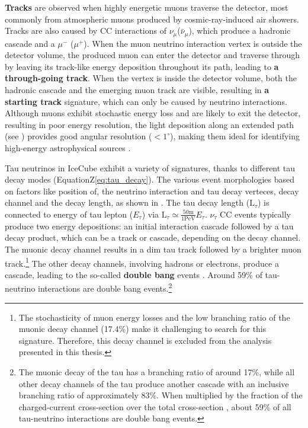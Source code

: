 \textbf{Tracks} are observed when highly energetic muons traverse the detector, most commonly from atmospheric muons produced by cosmic-ray-induced air showers. Tracks are also caused by CC interactions of $\nu_{\mu}$($\bar{\nu}_\mu$), which produce a hadronic cascade and a $\mu^-$ ($\mu^+$). When the muon neutrino interaction vertex is outside the detector volume, the produced muon can enter the detector and traverse through by leaving its track-like energy deposition throughout its path, leading to \textbf{a through-going track}.  When the vertex is inside the detector volume, both the hadronic cascade and the emerging muon track are visible, resulting in \textbf{a starting track} signature, which can only be caused by neutrino interactions. Although muons exhibit stochastic energy loss and are likely to exit the detector, resulting in poor energy resolution, the light deposition along an extended path (see ) provides good angular resolution ($< 1^\circ$), making them ideal for identifying high-energy astrophysical sources . 

Tau neutrinos in IceCube exhibit a variety of signatures, thanks to different tau decay modes (EquationZ\ref{eq:tau_decay}). The various event morphologies  based on factors like position of, the neutrino interaction and tau decay verteces, decay channel and the decay length, as shown in . The tau decay length ($\mathrm{L}_\tau$) is connected to energy of tau lepton ($E_{\tau}$) via $\mathrm{L}_{\tau}\simeq\frac{50\mathrm{m}}{1\mathrm{PeV}}E_{\tau}$. $\nu_{\tau}$ CC events typically produce two energy depositions: an initial interaction cascade followed by a tau decay product, which can be a track or cascade, depending on the decay channel. The muonic decay channel results in a dim tau track followed by a brighter muon track.\footnote{The stochasticity of muon energy losses and the low branching ratio of the muonic decay channel (17.4\%) make it challenging to search for this signature. Therefore, this decay channel is excluded from the analysis presented in this thesis.} The other decay channels, involving hadrons or electrons, produce a cascade, leading to the so-called \textbf{double bang} events . Around 59\% of tau-neutrino interactions are double bang events.\footnote{The muonic decay of the tau has a branching ratio of around 17\%, while all other decay channels of the tau produce another cascade with an inclusive branching ratio of approximately 83\%. When multiplied by the fraction of the charged-current cross-section over the total cross-section \cite{PDG_2024}, about 59\% of all tau-neutrino interactions are double bang events.}

